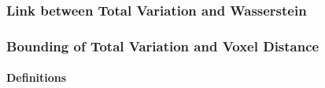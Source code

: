 \subsubsection{Link between Total Variation and Wasserstein}
%
%
%
%

\subsubsection{Bounding of Total Variation and Voxel Distance}
%

\paragraph{Definitions}

